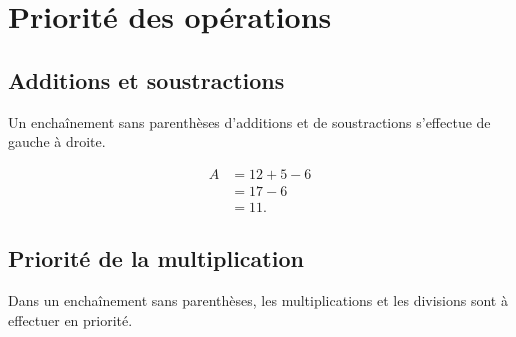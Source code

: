 
\section{Priorité des opérations}



\subsection{Additions et soustractions}

\begin{Aretenir}
    Un enchaînement sans parenthèses d'additions et de soustractions s'effectue de gauche à droite.
\end{Aretenir}

\begin{example}
    \begin{subequations}
        \begin{align}
            A&=12+5-6\\
            &=17-6\\
            &=11.
        \end{align}
    \end{subequations}
\end{example}

\subsection{Priorité de la multiplication}

\begin{Aretenir}
    Dans un enchaînement sans parenthèses, les multiplications et les divisions sont à effectuer en priorité.
\end{Aretenir}

